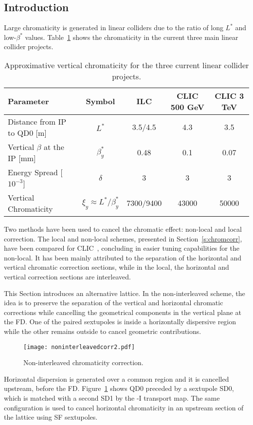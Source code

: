 \subsection{Introduction}
Large chromaticity is generated in linear colliders due to the ratio of long $L^*$ and low-$\beta^*$ values. Table~\ref{t:chromlat} shows the chromaticity in the current three main linear collider projects.\par
\begin{table}[!htb]
\centering
\begin{tabular}{l|c||c|c|c}\hline
Parameter & Symbol & ILC & CLIC 500 GeV& CLIC 3 TeV\\\hline\hline
Distance from IP to QD0 [m] & $L^*$& 3.5/4.5 & 4.3 & 3.5\\
Vertical $\beta$ at the IP [mm] &$\beta_y^*$& 0.48 & 0.1&0.07\\
Energy Spread [$10^{-3}$]& $\delta$&3&3&3\\\hline
Vertical Chromaticity & $\xi_y\approx L^*/\beta^*_y$&7300/9400&43000&50000\\\hline
\end{tabular}\caption{Approximative vertical chromaticity for the three current linear collider projects.}\label{t:chromlat}
\end{table}
Two methods have been used to cancel the chromatic effect: non-local and local correction. The local and non-local schemes, presented in Section~\ref{s:chromcorr}, have been compared for CLIC~\cite{PhysRevSTAB.17.101001}, concluding in easier tuning capabilities for the non-local. It has been mainly attributed to the separation of the horizontal and vertical chromatic correction sections, while in the local, the horizontal and vertical correction sections are interleaved.\par
This Section introduces an alternative lattice. In the non-interleaved scheme, the idea is to preserve the separation of the vertical and horizontal chromatic corrections  while cancelling the geometrical components in the vertical plane at the FD. One of the paired sextupoles is inside a horizontally dispersive region while the other remains outside to cancel geometric contributions.\par
\begin{figure}[!htb]
   \centering
   \texttt{[image: noninterleavedcorr2.pdf]}
   \caption{Non-interleaved chromaticity correction.}
   \label{f-noninterleaved}
\end{figure}
 Horizontal dispersion is generated over a common region and it is cancelled upstream, before the FD. Figure~\ref{f-noninterleaved} shows QD0 preceded by a sextupole SD0, which is matched with a second SD1 by the -I transport map. The same configuration is used to cancel horizontal chromaticity in an upstream section of the lattice using SF sextupoles.\par

